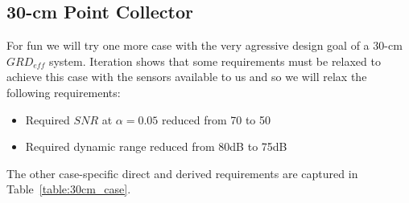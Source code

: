 \documentclass[]{spieman}  %
\begin{document}
\begin{table}[h!]
\centering
{}
\caption{Dependent system parameters for optimized 1-m system}
\label{table:1m_parameters}
\end{table}

\subsection{30-cm Point Collector} 

For fun we will try one more case with the very agressive design goal of a 30-cm $GRD_{eff}$ system.  Iteration shows that some requirements must be relaxed to achieve this case with the sensors available to us and so we will relax the following requirements:
\begin{itemize}
\item Required $SNR$ at $\alpha = 0.05$ reduced from 70 to 50
\item Required dynamic range reduced from 80dB to 75dB
\end{itemize}

The other case-specific direct and derived requirements are captured in Table~\ref{table:30cm_case}. 
\end{document}
